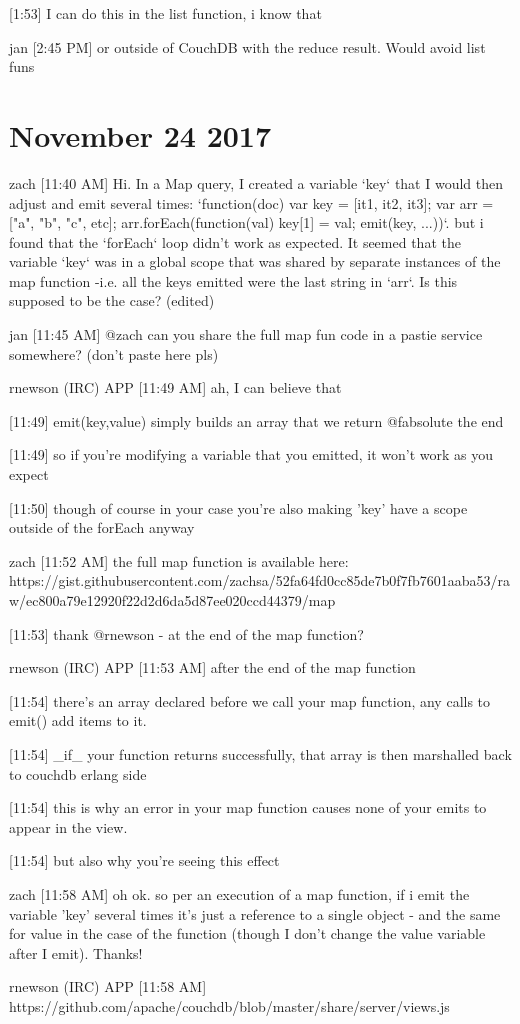 [1:53]
I can do this in the list function, i know that

jan [2:45 PM]
or outside of CouchDB with the reduce result. Would avoid list funs

\section{November 24 2017}
\label{slack-24-nov}
zach [11:40 AM]
Hi. In a Map query, I created a variable `key` that I would then adjust and emit several times: `function(doc) {var key = [it1, it2, it3]; var arr = ["a", "b", "c", etc]; arr.forEach(function(val) {key[1] = val; emit(key, ...)})}`. but i found that the `forEach` loop didn't work as expected. It seemed that the variable `key` was in a global scope that was shared by separate instances of the map function -i.e. all the keys emitted were the last string in `arr`. Is this supposed to be the case? (edited)

jan [11:45 AM]
@zach can you share the full map fun code in a pastie service somewhere? (don’t paste here pls)

rnewson (IRC) APP [11:49 AM]
ah, I can believe that

    [11:49]
emit(key,value) simply builds an array that we return @fabsolute the end

    [11:49]
so if you're modifying a variable that you emitted, it won't work as you expect

    [11:50]
though of course in your case you're also making 'key' have a scope outside of the forEach anyway

zach [11:52 AM]
the full map function is available here: https://gist.githubusercontent.com/zachsa/52fa64fd0cc85de7b0f7fb7601aaba53/raw/ec800a79e12920f22d2d6da5d87ee020ccd44379/map%

[11:53]
thank @rnewson - at the end of the map function?

rnewson (IRC) APP [11:53 AM]
after the end of the map function

    [11:54]
there's an array declared before we call your map function, any calls to emit() add items to it.

[11:54]
\_if\_ your function returns successfully, that array is then marshalled back to couchdb erlang side

    [11:54]
this is why an error in your map function causes none of your emits to appear in the view.

[11:54]
but also why you're seeing this effect

zach [11:58 AM]
oh ok. so per an execution of a map function, if i emit the variable 'key' several times it's just a reference to a single object - and the same for value in the case of the function (though I don't change the value variable after I emit). Thanks!

rnewson (IRC) APP [11:58 AM]
https://github.com/apache/couchdb/blob/master/share/server/views.js